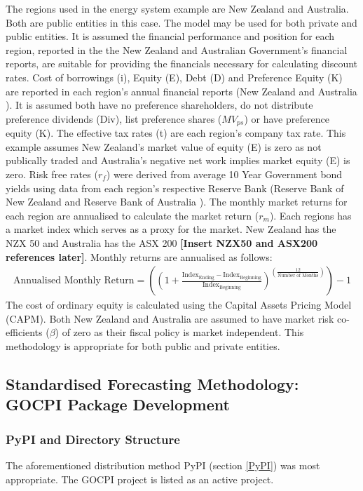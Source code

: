 \documentclass[12pt]{article}
\begin{document}
The regions used in the energy system example are New Zealand and Australia. 
Both are public entities in this case.
The model may be used for both private and public entities.
It is assumed the financial performance and position for each region, reported in the the New Zealand and Australian Government's financial reports, are suitable for providing the financials necessary for calculating discount rates.
Cost of borrowings (i), Equity (E),  Debt (D) and Preference Equity (K) 
are reported in each region's annual financial reports (New Zealand \cite{TNZ_FR} and Australia \cite{AG_FR}).
It is assumed both have no preference shareholders, do not distribute preference dividends (Div), list preference shares ($MV_{ps}$) or have preference equity (K).
The effective tax rates (t) are each region's company tax rate. 
This example assumes New Zealand's market value of equity (E) is zero as not publically traded and Australia's negative net work implies market equity (E) is zero.
Risk free rates ($r_f$) were derived from average 10 Year Government bond yields using data from each region's respective 
Reserve Bank (Reserve Bank of New Zealand \cite{RBNZ_WIR} and Reserve Bank of Australia \cite{RBA_ZCL}). 
The monthly market returns for each region are annualised to calculate the market return ($r_m$). 
Each regions has a market index which serves as a proxy for the market. 
New Zealand has the NZX 50 and Australia has the ASX 200 \textbf{[Insert NZX50 and ASX200 references later]}.
Monthly returns are annualised as follows: 
\begin{align}
	\text{Annualised Monthly Return} = ((1 + \frac{\text{Index}_{\text{Ending}}-\text{Index}_{\text{Beginning}}}{\text{Index}_{\text{Beginning}}})^{(\frac{12}{\text{Number of Months}})})-1
\end{align}
The cost of ordinary equity is calculated using the Capital Assets Pricing Model (CAPM). 
Both New Zealand and Australia are assumed to have market risk co-efficients ($\beta$) of zero as their fiscal policy is market independent.
This methodology is appropriate for both public and private entities.

\subsection{Standardised Forecasting Methodology: GOCPI Package Development}

\subsubsection{PyPI and Directory Structure}
The aforementioned distribution method PyPI (section \ref{PyPI}) was most appropriate.
The GOCPI project is listed as an active project.
\end{document}
